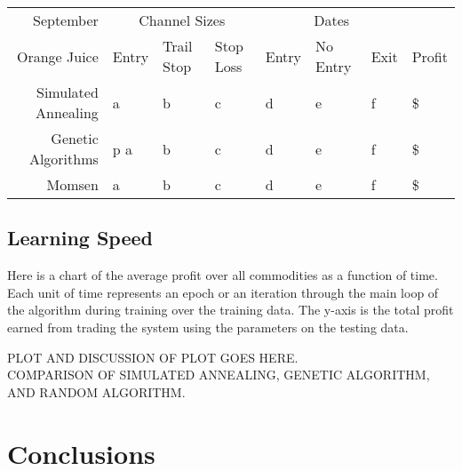 \documentclass[10pt]{article}
\begin{document}
\begin{tabular}{|r|l|l|l|l|l|l|l|}
  \hline
  September    & \multicolumn{3}{|c|}{Channel Sizes} & \multicolumn{3}{|c|}{Dates} &  \\
  Orange Juice & Entry & Trail Stop & Stop Loss & Entry & No Entry & Exit & Profit\\ \hline
  Simulated Annealing & a & b & c & d & e & f & \$ \\ \hline
  Genetic Algorithms &p a & b & c & d & e & f & \$ \\ \hline
  Momsen &  a & b & c & d & e & f & \$ \\ \hline
\end{tabular}

\subsection{Learning Speed}

Here is a chart of the average profit over all commodities as a function of
time.  Each unit of time represents an epoch or an iteration through the main
loop of the algorithm during training over the training data.  The y-axis is the
total profit earned from trading the system using the parameters on the testing
data.

PLOT AND DISCUSSION OF PLOT GOES HERE.\\
COMPARISON OF SIMULATED ANNEALING, GENETIC ALGORITHM, AND RANDOM ALGORITHM.\\

\section{Conclusions}



%
%
\end{document}
